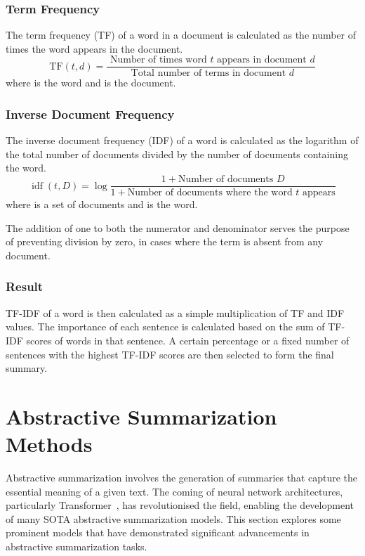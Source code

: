 \documentclass[english, ba, kiv, he, iso690numb, pdf, viewonly]{fasthesis}
\begin{document}
	\subsubsection{Term Frequency}
	The term frequency (TF) of a word in a document is calculated as the number of times the word appears in the document. 
	$$
	\mathrm{TF}(t, d)=\frac{\text { Number of times word } t \text { appears in document } d}{\text { Total number of terms in document } d}
	$$
	where  is the word and  is the document.
	
	\subsubsection{Inverse Document Frequency}
	The inverse document frequency (IDF) of a word is calculated as the logarithm of the total number of documents divided by the number of documents containing the word.
	$$
	\operatorname{idf}(t, D)=\log \frac{1 + \text{Number of documents } D}{1 + \text{Number of documents where the word } t \text{ appears}}
	$$
	where  is a set of documents and  is the word.
	
	The addition of one to both the numerator and denominator serves the purpose of preventing division by zero, in cases where the term  is absent from any document.
	
	\subsubsection{Result}
	TF-IDF of a word  is then calculated as a simple multiplication of TF and IDF values. 
	The importance of each sentence is calculated based on the sum of TF-IDF scores of words in that sentence. A certain percentage or a fixed number of sentences with the highest TF-IDF scores are then selected to form the final summary.
	
	\section{Abstractive Summarization Methods}
	Abstractive summarization involves the generation of summaries that capture the essential meaning of a given text. The coming of neural network architectures, particularly Transformer~\cite{vaswani2023attention}, has revolutionised the field, enabling the development of many SOTA abstractive summarization models. This section explores some prominent models that have demonstrated significant advancements in abstractive summarization tasks.
	
\end{document}
